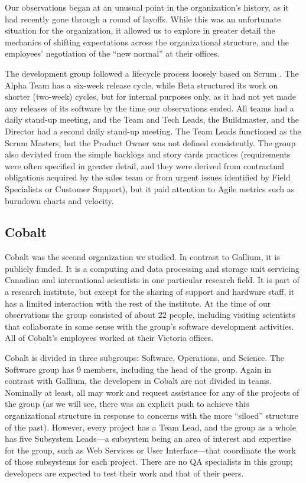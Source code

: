 \documentclass[10pt, conference, compsocconf]{IEEEtran}
\begin{document}
Our observations began at an unusual point in the organization's history, as it had recently gone through a round of layoffs. While this was an unfortunate situation for the organization, it allowed us to explore in greater detail the mechanics of shifting expectations across the organizational structure, and the employees' negotiation of the ``new normal'' at their offices.

The development group followed a lifecycle process loosely based on Scrum \cite{Schwaber2001}. The Alpha Team has a six-week release cycle, while Beta structured its work on shorter (two-week) cycles, but for internal purposes only, as it had not yet made any releases of its software by the time our observations ended. All teams had a daily stand-up meeting, and the Team and Tech Leads, the Buildmaster, and the Director had a second daily stand-up meeting. The Team Leads functioned as the Scrum Masters, but the Product Owner was not defined consistently. The group also deviated from the simple backlogs and story cards practices (requirements were often specified in greater detail, and they were derived from contractual obligations acquired by the sales team or from urgent issues identified by Field Specialists or Customer Support), but it paid attention to Agile metrics such as burndown charts and velocity.



\subsection{Cobalt}

Cobalt was the second organization we studied. In contrast to Gallium, it is publicly funded. It is a computing and data processing and storage unit servicing Canadian and international scientists in one particular research field. It is part of a research institute, but except for the sharing of support and hardware staff, it has a limited interaction with the rest of the institute. At the time of our observations the group consisted of about 22 people, including visiting scientists that collaborate in some sense with the group's software development activities. All of Cobalt's employees worked at their Victoria offices.

Cobalt is divided in three subgroups: Software, Operations, and Science. The Software group has 9 members, including the head of the group. Again in contrast with Gallium, the developers in Cobalt are not divided in teams. Nominally at least, all may work and request assistance for any of the projects of the group (as we will see, there was an explicit push to achieve this organizational structure in response to concerns with the more ``siloed'' structure of the past). However, every project has a Team Lead, and the group as a whole has five Subsystem Leads---a subsystem being an area of interest and expertise for the group, such as Web Services or User Interface---that coordinate the work of those subsystems for each project. There are no QA specialists in this group; developers are expected to test their work and that of their peers.
\end{document}
